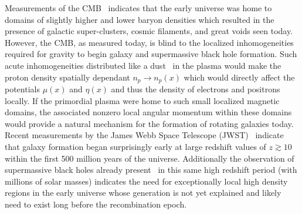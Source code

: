 \documentclass[a4paper]{article}
\begin{document}
Measurements of the CMB~\cite{aghanim2018planck} indicates that the early universe was home to domains of slightly higher and lower baryon densities which resulted in the presence of galactic super-clusters, cosmic filaments, and great voids seen today. However, the CMB, as measured today, is blind to the localized inhomogeneities required for gravity to begin galaxy and supermassive black hole formation. Such acute inhomogeneities distributed like a dust~\cite{grayson2023electronpositron} in the plasma would make the proton density spatially dependant $n_{p}\rightarrow n_{p}(x)$ which would directly affect the potentials $\mu(x)$ and $\eta(x)$ and thus the density of electrons and positrons locally. If the primordial plasma were home to such small localized magnetic domains, the associated nonzero local angular momentum within these domains would provide a natural mechanism for the formation of rotating galaxies today. Recent measurements by the James Webb Space Telescope (JWST)~\cite{yan2022first,adams2023discovery,arrabal2023spectroscopic} indicate that galaxy formation began surprisingly early at large redshift values of $z\gtrsim10$ within the first 500 million years of the universe. Additionally the observation of supermassive black holes already present~\cite{larson2023ceers} in this same high redshift period (with millions of solar masses) indicates the need for exceptionally local high density regions in the early universe whose generation is not yet explained and likely need to exist long before the recombination epoch.


\end{document}

